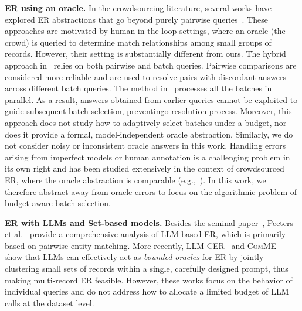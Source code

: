 \documentclass[sigconf, nonacm]{acmart}
\begin{document}
{\noindent\textbf{ER using an oracle.}
In the crowdsourcing literature, several works have explored ER abstractions that go beyond purely pairwise queries~\cite{waldo, crowder}.
These approaches are motivated by human-in-the-loop settings, where an oracle (the crowd) is queried to determine match relationships among small groups of records.
However, their setting is substantially different from ours. The hybrid approach in~\cite{waldo} relies on both pairwise and batch queries. Pairwise comparisons are considered more reliable and are used to resolve pairs with discordant answers across different batch queries.
The method in~\cite{crowder} processes all the batches in parallel. As a result, answers obtained from earlier queries cannot be exploited to guide subsequent batch selection, preventingo resolution process. Moreover, this approach does not study how to adaptively select batches under a budget, nor does it provide a formal, model-independent oracle abstraction.
Similarly, we do not consider noisy or inconsistent oracle answers in this work.
Handling errors arising from imperfect models or human annotation is a challenging problem in its own right and has been studied extensively in the context of crowdsourced ER, where the oracle abstraction is comparable (e.g.,~\cite{crowd_error_01,crowd_error_02,crowd_error_03,crowd_error_04}).
In this work, we therefore abstract away from oracle errors to focus on the algorithmic problem of budget-aware batch selection.


\noindent\textbf{ER with LLMs and Set-based models.}
Besides the seminal paper~\cite{DBLP:journals/pvldb/NarayanCOR22}, Peeters et al.~\cite{DBLP:conf/edbt/PeetersSB25} provide a comprehensive analysis of LLM-based ER, which is primarily based on pairwise entity matching.
More recently, \textsc{LLM-CER}~\cite{LLM-CER} and \textsc{ComME}~\cite{DBLP:conf/coling/WangCLCHSWZ25} show that LLMs can effectively act as \emph{bounded oracles} for ER by jointly clustering small sets of records within a single, carefully designed prompt, thus making multi-record ER feasible.
However, these works focus on the behavior of individual queries and do not address how to allocate a limited budget of LLM calls at the dataset level.

}
\end{document}
